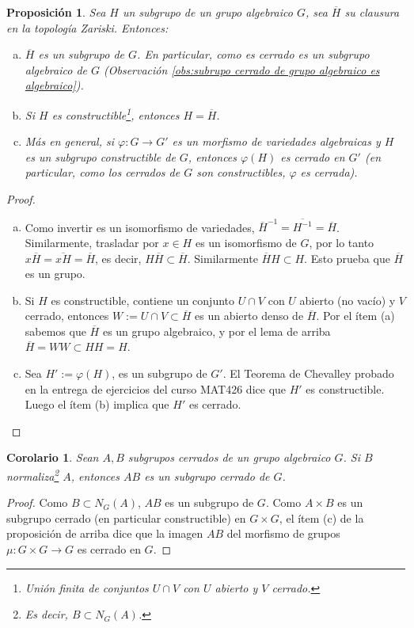 \documentclass[spanish,12pt]{amsart}
\newtheorem{corollary}[theorem]{Corolario}
\newtheorem{proposition}[theorem]{Proposición}
\theoremstyle{definition}
\theoremstyle{remark}
\numberwithin{equation}{section}
\renewcommand{\bar}[1]{\overline{#1}}
\begin{document}
\begin{proposition}
Sea $H$ un subgrupo de un grupo algebraico $G$, sea $\bar H$ su clausura en la topología Zariski. Entonces:
\begin{enumerate}[(a)]
\item $\bar H$ es un subgrupo de $G$. En particular, como es cerrado es un subgrupo algebraico de $G$ (Observación \ref{obs:subrupo cerrado de grupo algebraico es algebraico}).
\item Si $H$ es \textit{constructible}\footnote{Unión finita de conjuntos $U \cap V$ con $U$ abierto y $V$ cerrado.}, entonces $H = \bar H$.
\item Más en general, si $\varphi : G \to G'$ es un morfismo de variedades algebraicas y $H$ es un subgrupo constructible de $G$, entonces $\varphi (H)$ es cerrado en $G'$ (en particular, como los cerrados de $G$ son constructibles, $\varphi$ es \textit{cerrada}).
\end{enumerate}
\end{proposition}
\begin{proof}
\begin{enumerate}[(a)]
\item Como invertir es un isomorfismo de variedades, $\bar H ^{-1} = \bar{H^{-1}} = \bar H$. Similarmente, trasladar por $x \in H$ es un isomorfismo de $G$, por lo tanto $x \bar H = \bar{x H} = \bar H$, es decir, $H \bar H \subset \bar H$. Similarmente $\bar H H \subset H$. Esto prueba que $\bar H$ es un grupo.
\item Si $H$ es constructible, contiene un conjunto $U \cap V$ con $U$ abierto (no vacío) y $V$ cerrado, entonces $W := U \cap V \subset \bar H$ es un abierto denso de $\bar H$. Por el ítem (a) sabemos que $\bar H$ es un grupo algebraico, y por el lema de arriba $\bar H = W W \subset H H = H$.
\item Sea $H' := \varphi (H)$, es un subgrupo de $G'$. El Teorema de Chevalley probado en la entrega de ejercicios del curso MAT426 dice que $H'$ es constructible. Luego el ítem (b) implica que $H'$ es cerrado.
\end{enumerate}
\end{proof}

\begin{corollary}\label{corollary:si A y B son cerrados entonces AB es cerrado}
Sean $A,B$ subgrupos cerrados de un grupo algebraico $G$. Si $B$ \textit{normaliza}\footnote{Es decir, $B \subset N_G (A)$.} $A$, entonces $AB$ es un subgrupo cerrado de $G$.
\end{corollary}
\begin{proof}
Como $B \subset N_G (A)$, $AB$ es un subgrupo de $G$. Como $A \times B$ es un subgrupo cerrado (en particular constructible) en $G \times G$, el ítem (c) de la proposición de arriba dice que la imagen $AB$ del morfismo de grupos $\mu : G \times G \to G$ es cerrado en $G$.
\end{proof}
\end{document}
